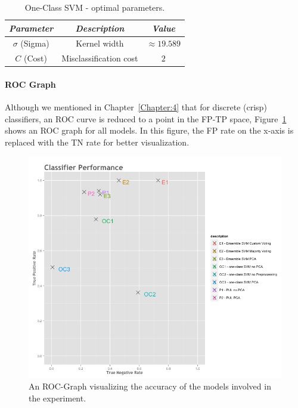 \begin{table}[ht!]
  \begin{center}
    \caption{One-Class SVM - optimal parameters.}
    \label{tab:params-oc}
    \begin{tabular}{|c|c|c|}\hline
    \textit{Parameter} & \textit{Description} & \textit{Value} \\
      \hline
    \(\sigma\) (Sigma) & Kernel width & \(\approx19.589\) \\ 
     \hline
     \(C\) (Cost) & Misclassification cost &  \(2\) \\
     \hline
    \end{tabular}
  \end{center}
\end{table}


\paragraph*{ROC Graph} \hfill \break
Although we mentioned in Chapter~\ref{Chapter:4} that for discrete (crisp) classifiers, an ROC curve is reduced to a point in the FP-TP space, Figure~\ref{fig:classifier-comparison} shows an ROC graph for all models. In this figure, the FP rate on the x-axis is replaced with the TN rate for better visualization.
\begin{figure}[ht!]\vspace*{-5cm}

    \centering 
    \includegraphics[scale=0.65]{Graphics/classifier-performance.png}
    \caption{An ROC-Graph visualizing the accuracy of the models involved in the experiment.}
    \label{fig:classifier-comparison}
\end{figure}
